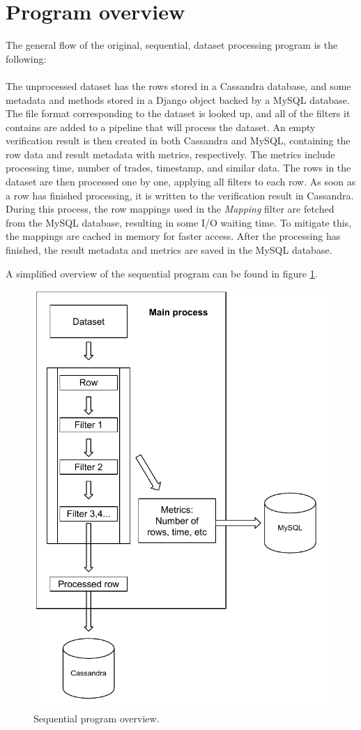 \section{Program overview}
The general flow of the original, sequential, dataset processing program is the following:
\\\\
The unprocessed dataset has the rows stored in a Cassandra database, and some metadata and methods stored in a Django object backed by a MySQL database.
The file format corresponding to the dataset is looked up, and all of the filters it contains are added to a pipeline that will process the dataset.
An empty verification result is then created in both Cassandra and MySQL, containing the row data and result metadata with metrics, respectively.
The metrics include processing time, number of trades, timestamp, and similar data. The rows in the dataset are then processed one by one,
applying all filters to each row. As soon as a row has finished processing, it is written to the verification result in Cassandra.
During this process, the row mappings used in the \textit{Mapping} filter are fetched from the MySQL database, resulting in some
I/O waiting time. To mitigate this, the mappings are cached in memory for faster access. After the processing has finished, the result metadata
and metrics are saved in the MySQL database.

A simplified overview of the sequential program can be found in figure \ref{fig:sequential_program_overview}.

\begin{figure}[ht]
  \centering
  \includegraphics[width=120mm]{figures/program_overview_sequential.pdf}
  \caption[Sequential program overview.]{Sequential program overview.}
  \label{fig:sequential_program_overview}
\end{figure}
